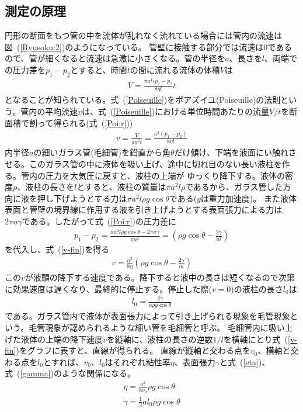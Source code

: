 \documentclass[a4j,10pt]{jarticle}
\newcommand{\Equref}[1]{式~(\ref{#1})}
\newcommand{\Figref}[1]{図~(\ref{#1})}
\begin{document}
\subsection{測定の原理}
円形の断面をもつ管の中を流体が乱れなく流れている場合には管内の流速は\Figref{Ryusoku:2}のようになっている。
管壁に接触する部分では流速は0であるので、管が細くなると流速は急激に小さくなる。管の半径を$a$、長さを$l$、両端での圧力差を$p_{1}-p_{2}$とすると、時間$t$の間に流れる流体の体積$V$は
\begin{eqnarray}
\label{Poiseuille}
V = \frac{\pi a^{4}(p_{1}-p_{2}}{8 \eta l}t
\end{eqnarray}
となることが知られている。\Equref{Poiseuille}をポアズイユ(Poiseuille)の法則という。管内の平均流速$v$は、\Equref{Poiseuille}における単位時間あたりの流量$V/t$を断面積で割って得られる(\Equref{Poi:r})
\begin{eqnarray}
\label{Poi:r}
v=\frac{V}{\pi a^{2}t}=\frac{a^{2}(p_{1}-p_{2})}{8 \eta l}
\end{eqnarray}
内半径$a$の細いガラス管(毛細管)を鉛直から角$\theta$だけ傾け、下端を液面にい触れさせる。このガラス管の中に液体を吸い上げ、途中に切れ目のない長い液柱を作る。管内の圧力を大気圧に戻すと、液柱の上端が
ゆっくり降下する。液体の密度$\rho$、液柱の長さを$l$とすると、液柱の質量は$\pi a^{2}l\rho$であるから、ガラス管した方向に液を押し下げようとする力は$\pi a^{2}l\rho g \cos{\theta}$である($g$は重力加速度)。
また液体表面と管壁の境界線に作用する液を引き上げようとする表面張力による力は$2\pi a \gamma$である。したがって\Equref{Poi:r}の圧力差に
\begin{eqnarray}
\label{pres:dif}
p_{1}-p_{2}=\frac{\pi a^{2}l\rho g \cos{\theta}-2\pi a \gamma}{\pi a^2}=\left(\rho g \cos{\theta} - \frac{2\gamma}{al}\right)
\end{eqnarray}
を代入し、\Equref{v-fin}を得る
\begin{eqnarray}
\label{v-fin}
v=\frac{a^2}{8 \eta}\left(\rho g \cos{\theta} - \frac{2\gamma}{al}\right)
\end{eqnarray}
この$v$が液頭の降下する速度である。降下すると液中の長さは短くなるので次第に効果速度は遅くなり、最終的に停止する。停止した際($v=0$)の液柱の長さ$l_0$は
\begin{eqnarray}
\label{l0}
l_0=\frac{2\gamma}{a\rho g \cos{\theta}}
\end{eqnarray}
である。ガラス管内で液体が表面張力によって引き上げられる現象を毛管現象という。毛管現象が認められるような細い管を毛細管と呼ぶ。
毛細管内に吸い上げた液体の上端の降下速度$v$を縦軸に、液柱の長さの逆数$1/l$を横軸にとり\Equref{v-fin}をグラフに表すと、直線が得られる。
直線が縦軸と交わる点を$v_0$、横軸と交わる点を$l_0$とすれば、$v_0$、$l_0$はそれぞれ粘性率$\eta$、表面張力$\gamma$と\Equref{eta}、\Equref{gamma}のような関係になる。
\begin{eqnarray}
\label{eta}
\eta = \frac{a^2}{8v_0}\rho g \cos{\theta}\\
\label{gamma}
\gamma = \frac{1}{2}al_0\rho g \cos{\theta}
\end{eqnarray}
\end{document}
